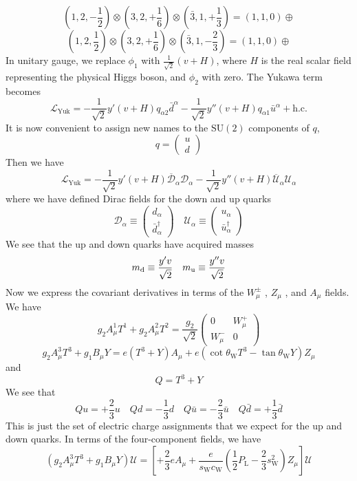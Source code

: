 \[(1,2,-\frac{1}{2}) \otimes (3, 2, +\frac{1}{6}) \otimes (\bar{3}, 1, +\frac{1}{3}) = (1,1,0) \oplus\]
\[(1,2, \frac{1}{2}) \otimes (3, 2, +\frac{1}{6}) \otimes (\bar{3}, 1, -\frac{2}{3}) = (1,1,0) \oplus\]
In unitary gauge, we replace $\phi_1$ with $\frac{1}{\sqrt{2}}(v+H)$, where $H$ is the real scalar field representing the physical Higgs boson, and $\phi_2$ with zero. The Yukawa term becomes
\[\mathcal{L}_{\mathrm{Yuk}} = -\frac{1}{\sqrt{2}}y'(v+H)q_{\alpha 2}\bar{d}^{\alpha} - \frac{1}{\sqrt{2}}y''(v+H)q_{\alpha 1}\bar{u}^{\alpha} + \mathrm{h.c.}\]
It is now convenient to assign new names to the $\mathrm{SU}(2)$ components of $q$,
\[q = \begin{pmatrix}
u \\ d
\end{pmatrix} \]
Then we have
\[\mathcal{L}_{\mathrm{Yuk}} = -\frac{1}{\sqrt{2}}y'(v+H) \overline{\mathcal{D}}_{\alpha}\mathcal{D}_{\alpha} -\frac{1}{\sqrt{2}}y''(v+H) \overline{\mathcal{U}}_{\alpha}\mathcal{U}_{\alpha}\]
where we have defined Dirac fields for the down and up quarks
\[\mathcal{D}_{\alpha} \equiv \begin{pmatrix}
d_{\alpha} \\ \bar{d}^{\dagger}_{\alpha}
\end{pmatrix} \quad  \mathcal{U}_{\alpha} \equiv \begin{pmatrix}
u_{\alpha} \\ \bar{u}^{\dagger}_{\alpha}
\end{pmatrix}\]
We see  that the up and down quarks have acquired masses
\[m_{\rm d} \equiv \frac{y'v}{\sqrt{2}} \quad m_{\rm u} \equiv \frac{y''v}{\sqrt{2}}\]
Now we express the covariant derivatives in terms of the $W_{\mu}^{\pm}$ , $Z_{\mu}$ , and $A_{\mu}$ fields. We have
\[g_2 A^1_{\mu}T^1 + g_2 A^2_{\mu}T^2 = \frac{g_2}{\sqrt{2}} \begin{pmatrix}
0 & W_{\mu}^+ \\ W^{-}_{\mu} & 0
\end{pmatrix} \]
\[g_2A^3_{\mu}T^3 + g_1 B_{\mu} Y = e(T^3+Y)A_{\mu} + e(\cot\theta_{\mathrm{W}} T^3 - \tan\theta_{\mathrm{W}} Y)Z_{\mu}\]
and
\[Q = T^3 + Y\]
We see that
\[Qu = +\frac{2}{3}u \quad Qd = -\frac{1}{3}d \quad Q\bar{u} = -\frac{2}{3}\bar{u} \quad Q\bar{d} = +\frac{1}{3}\bar{d}\]
This is just the set of electric charge assignments that we expect for the up and down quarks. In terms of the four-component fields, we have
\[(g_2A^3_{\mu}T^3 + g_1 B_{\mu} Y) \mathcal{U} = \left[ + \frac{2}{3}eA_{\mu} + \frac{e}{s_{\mathrm{W}} c_{\mathrm{W}}}( \frac{1}{2}P_{\mathrm{L}} -\frac{2}{3}  s_{\mathrm{W}}^2)Z_{\mu} \right] \mathcal{U}\]
